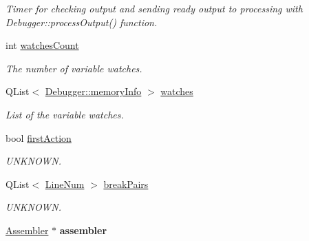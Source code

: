 \begin{DoxyCompactItemize}
\begin{DoxyCompactList}\small\item\em Timer for checking output and sending ready output to processing with Debugger\+::process\+Output() function. \end{DoxyCompactList}\item 
\hypertarget{class_debugger_a3a9f51bd7e9885d57408177656ef9903}{}int \hyperlink{class_debugger_a3a9f51bd7e9885d57408177656ef9903}{watches\+Count}\label{class_debugger_a3a9f51bd7e9885d57408177656ef9903}

\begin{DoxyCompactList}\small\item\em The number of variable watches. \end{DoxyCompactList}\item 
\hypertarget{class_debugger_ae8d68c1ebbcd62fbadb3d4f494eac132}{}Q\+List$<$ \hyperlink{struct_debugger_1_1memory_info}{Debugger\+::memory\+Info} $>$ \hyperlink{class_debugger_ae8d68c1ebbcd62fbadb3d4f494eac132}{watches}\label{class_debugger_ae8d68c1ebbcd62fbadb3d4f494eac132}

\begin{DoxyCompactList}\small\item\em List of the variable watches. \end{DoxyCompactList}\item 
\hypertarget{class_debugger_a034fcdc2cfeac7d404eaf22f3cec72b9}{}bool \hyperlink{class_debugger_a034fcdc2cfeac7d404eaf22f3cec72b9}{first\+Action}\label{class_debugger_a034fcdc2cfeac7d404eaf22f3cec72b9}

\begin{DoxyCompactList}\small\item\em U\+N\+K\+N\+O\+W\+N. \end{DoxyCompactList}\item 
\hypertarget{class_debugger_a653485bb08b57e6505c2f98fee8df379}{}Q\+List$<$ \hyperlink{struct_assembler_1_1_line_num}{Line\+Num} $>$ \hyperlink{class_debugger_a653485bb08b57e6505c2f98fee8df379}{break\+Pairs}\label{class_debugger_a653485bb08b57e6505c2f98fee8df379}

\begin{DoxyCompactList}\small\item\em U\+N\+K\+N\+O\+W\+N. \end{DoxyCompactList}\item 
\hypertarget{class_debugger_a820589c5102d67769128d41a17754d07}{}\hyperlink{class_assembler}{Assembler} $\ast$ {\bfseries assembler}\label{class_debugger_a820589c5102d67769128d41a17754d07}


\end{DoxyCompactItemize}
